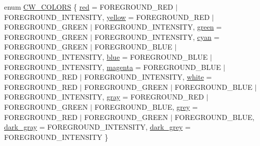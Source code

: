 \begin{DoxyCompactItemize}
\item 
enum \hyperlink{namespacecolorwin_a9c26d66eac71ba049d125e59a63e95d4}{C\+W\+\_\+\+C\+O\+L\+O\+RS} \{ \newline
\hyperlink{namespacecolorwin_a9c26d66eac71ba049d125e59a63e95d4a23307d84225383447bdadee3a91ddffc}{red} = F\+O\+R\+E\+G\+R\+O\+U\+N\+D\+\_\+\+R\+ED $\vert$ F\+O\+R\+E\+G\+R\+O\+U\+N\+D\+\_\+\+I\+N\+T\+E\+N\+S\+I\+TY, 
\hyperlink{namespacecolorwin_a9c26d66eac71ba049d125e59a63e95d4a9580d3cc5c851e597316f0ef3e143573}{yellow} = F\+O\+R\+E\+G\+R\+O\+U\+N\+D\+\_\+\+R\+ED $\vert$ F\+O\+R\+E\+G\+R\+O\+U\+N\+D\+\_\+\+G\+R\+E\+EN $\vert$ F\+O\+R\+E\+G\+R\+O\+U\+N\+D\+\_\+\+I\+N\+T\+E\+N\+S\+I\+TY, 
\hyperlink{namespacecolorwin_a9c26d66eac71ba049d125e59a63e95d4a12bc907532cce6110300ad5a289b4765}{green} = F\+O\+R\+E\+G\+R\+O\+U\+N\+D\+\_\+\+G\+R\+E\+EN $\vert$ F\+O\+R\+E\+G\+R\+O\+U\+N\+D\+\_\+\+I\+N\+T\+E\+N\+S\+I\+TY, 
\hyperlink{namespacecolorwin_a9c26d66eac71ba049d125e59a63e95d4a4c0a94b5f1f9a57baf9b3bab9f517e20}{cyan} = F\+O\+R\+E\+G\+R\+O\+U\+N\+D\+\_\+\+G\+R\+E\+EN $\vert$ F\+O\+R\+E\+G\+R\+O\+U\+N\+D\+\_\+\+B\+L\+UE $\vert$ F\+O\+R\+E\+G\+R\+O\+U\+N\+D\+\_\+\+I\+N\+T\+E\+N\+S\+I\+TY, 
\newline
\hyperlink{namespacecolorwin_a9c26d66eac71ba049d125e59a63e95d4ace00d92a28d77eefaa72277a2b07f84b}{blue} = F\+O\+R\+E\+G\+R\+O\+U\+N\+D\+\_\+\+B\+L\+UE $\vert$ F\+O\+R\+E\+G\+R\+O\+U\+N\+D\+\_\+\+I\+N\+T\+E\+N\+S\+I\+TY, 
\hyperlink{namespacecolorwin_a9c26d66eac71ba049d125e59a63e95d4ad333bc19d30b4237acbef6daaac86bdd}{magenta} = F\+O\+R\+E\+G\+R\+O\+U\+N\+D\+\_\+\+B\+L\+UE $\vert$ F\+O\+R\+E\+G\+R\+O\+U\+N\+D\+\_\+\+R\+ED $\vert$ F\+O\+R\+E\+G\+R\+O\+U\+N\+D\+\_\+\+I\+N\+T\+E\+N\+S\+I\+TY, 
\hyperlink{namespacecolorwin_a9c26d66eac71ba049d125e59a63e95d4a6a787324514e8e24e7320e694ffc1f71}{white} = F\+O\+R\+E\+G\+R\+O\+U\+N\+D\+\_\+\+R\+ED $\vert$ F\+O\+R\+E\+G\+R\+O\+U\+N\+D\+\_\+\+G\+R\+E\+EN $\vert$ F\+O\+R\+E\+G\+R\+O\+U\+N\+D\+\_\+\+B\+L\+UE $\vert$ F\+O\+R\+E\+G\+R\+O\+U\+N\+D\+\_\+\+I\+N\+T\+E\+N\+S\+I\+TY, 
\hyperlink{namespacecolorwin_a9c26d66eac71ba049d125e59a63e95d4ad395083a220945d28c1a04f6c57f4a60}{gray} = F\+O\+R\+E\+G\+R\+O\+U\+N\+D\+\_\+\+R\+ED $\vert$ F\+O\+R\+E\+G\+R\+O\+U\+N\+D\+\_\+\+G\+R\+E\+EN $\vert$ F\+O\+R\+E\+G\+R\+O\+U\+N\+D\+\_\+\+B\+L\+UE, 
\newline
\hyperlink{namespacecolorwin_a9c26d66eac71ba049d125e59a63e95d4a0eeb6ad8861ccf80a4adf9442663e495}{grey} = F\+O\+R\+E\+G\+R\+O\+U\+N\+D\+\_\+\+R\+ED $\vert$ F\+O\+R\+E\+G\+R\+O\+U\+N\+D\+\_\+\+G\+R\+E\+EN $\vert$ F\+O\+R\+E\+G\+R\+O\+U\+N\+D\+\_\+\+B\+L\+UE, 
\hyperlink{namespacecolorwin_a9c26d66eac71ba049d125e59a63e95d4ac0d6440762e9af319b7c06cee7649540}{dark\+\_\+gray} = F\+O\+R\+E\+G\+R\+O\+U\+N\+D\+\_\+\+I\+N\+T\+E\+N\+S\+I\+TY, 
\hyperlink{namespacecolorwin_a9c26d66eac71ba049d125e59a63e95d4a1934087d9746aa8b314f24b677125863}{dark\+\_\+grey} = F\+O\+R\+E\+G\+R\+O\+U\+N\+D\+\_\+\+I\+N\+T\+E\+N\+S\+I\+TY
 \}
\end{DoxyCompactItemize}
